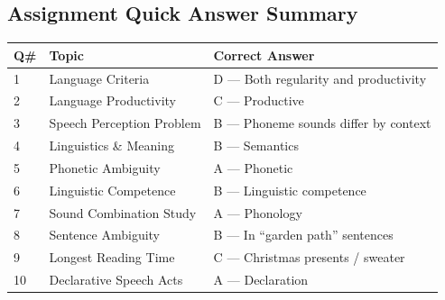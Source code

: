 \documentclass[11pt,a4paper]{article}
\newcommand{\bb}[1]{\textbf{#1}}
\begin{document}
\medskip
\subsection*{Assignment Quick Answer Summary}

\begin{center}
\renewcommand{\arraystretch}{1.4}
\begin{tabular}{|L{0.8cm}|L{5.5cm}|L{8.9cm}|}
\hline
\bb{Q\#} & \bb{Topic} & \bb{Correct Answer} \\
 & Language Criteria & D — Both regularity and productivity \\
2 & Language Productivity & C — Productive \\
3 & Speech Perception Problem & B — Phoneme sounds differ by context \\
4 & Linguistics \& Meaning & B — Semantics \\
5 & Phonetic Ambiguity & A — Phonetic \\
6 & Linguistic Competence & B — Linguistic competence \\
7 & Sound Combination Study & A — Phonology \\
8 & Sentence Ambiguity & B — In ``garden path'' sentences \\
9 & Longest Reading Time & C — Christmas presents / sweater \\
10 & Declarative Speech Acts & A — Declaration \\
\hline
\end{tabular}
\end{center}

\medskip
\end{document}
